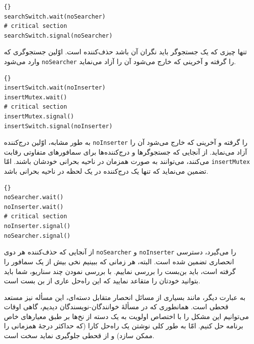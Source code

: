 \documentclass{book}
\begin{document}
\begin{latin}
\begin{lstlisting}[title=\rl{راه‌حل جستجو-درج-حذف (جستجوگر)}]{}
searchSwitch.wait(noSearcher)
# critical section
searchSwitch.signal(noSearcher)
\end{lstlisting}
\end{latin}

    تنها چیزی که یک جستجوگر باید نگران آن باشد حذف‌کننده است. 
    اوّلین جستجوگری که وارد می‌شود {\tt noSearcher} را گرفته و آخرینی که خارج می‌شود آن را آزاد می‌نماید. 

\begin{latin}
\begin{lstlisting}[title=\rl{راه‌حل جستجو-درج-حذف (درج‌کننده)}]{}
insertSwitch.wait(noInserter)
insertMutex.wait()
# critical section
insertMutex.signal()
insertSwitch.signal(noInserter)
\end{lstlisting}
\end{latin}

    به طور مشابه، اوّلین درج‌کننده‌ {\tt noInserter} را گرفته و آخرینی که خارج می‌شود آن را آزاد می‌نماید.
    از آنجایی که جستجوگرها و درج‌کننده‌ها برای سمافورهای متفاوتی رقابت می‌کنند، می‌توانند به صورت همزمان در ناحیه بحرانی خودشان 
    باشند. امّا {\tt insertMutex} تضمین می‌نماید که تنها یک درج‌کننده‌ در یک لحظه‌ در ناحیه بحرانی باشد. 

\begin{latin}
\begin{lstlisting}[title=\rl{راه‌حل جستجو-درج-حذف (حذف‌‌کننده)}]{}
noSearcher.wait()
noInserter.wait()
# critical section
noInserter.signal()
noSearcher.signal()
\end{lstlisting}
\end{latin}

    از آنجایی که حذف‌کننده هر دوی  {\tt noSearcher} و {\tt noInserter} را می‌گیرد، دسترسی انحصاری تضمین شده است. 
    البته، هر زمانی که ببینیم نخی بیش از یک سمافور را گرفته است، باید بن‌بست را بررسی نماییم. با بررسی نمودن چند سناریو، 
    شما باید بتوانید خودتان را متقاعد نمایید که این راه‌حل عاری از بن بست است. 

    به عبارت دیگر، مانند بسیاری از مسائل انحصار متقابل دسته‌ای، این مسأله نیز مستعد قحطی است. 
    همانطوری که در مسألهٔ خوانندگان-نویسندگان دیدیم، گاهی اوقات می‌توانیم این مشکل را با اختصاص اولویت به یک دسته از نخ‌ها 
    بر طبق معیارهای خاص برنامه حل کنیم. 
    امّا به طور کلی نوشتن یک راه‌حل کارا (که حداکثر درجهٔ همزمانی را ممکن سازد) و از قحطی جلوگیری نماید سخت است. 
\end{document}

